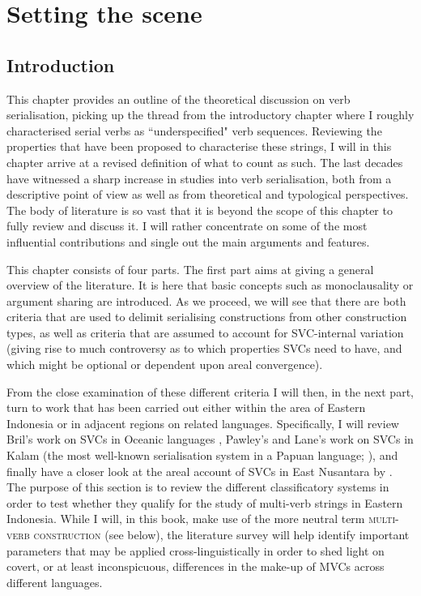 \chapter{Setting the scene}\label{ch:theory}
\section{Introduction}
This chapter provides an outline of the theoretical discussion on verb serialisation, picking up the thread from the introductory chapter where I roughly characterised serial verbs as ``underspecified" verb sequences. Reviewing the properties that have been proposed to characterise these strings, I will in this chapter arrive at a revised definition of what to count as such. The last decades have witnessed a sharp increase in studies into verb serialisation, both from a descriptive point of view as well as from theoretical and typological perspectives. The body of literature is so vast that it is beyond the scope of this chapter to fully review and discuss it. I will rather concentrate on some of the most influential contributions and single out the main arguments and features.

This chapter consists of four parts. The first part aims at giving a general overview of the literature. It is here that basic concepts such as monoclausality or argument sharing are introduced. As we proceed, we will see that there are both criteria that are used to delimit serialising constructions from other construction types, as well as criteria that are assumed to account for SVC-internal variation (giving rise to much controversy as to which properties SVCs need to have, and which might be optional or dependent upon areal convergence). 

From the close examination of these different criteria I will then, in the next part, turn to work that has been carried out either within the area of Eastern Indonesia or in adjacent regions on related languages. Specifically, I will review Bril's work on SVCs in Oceanic languages \citep{bril2004complex,bril2007nexus}, Pawley's and Lane's work on SVCs in Kalam (the most well-known serialisation system in a Papuan language; \citealt{Pawley1987, pawley2011event, lane2008kalam}), and finally have a closer look at the areal account of SVCs in East Nusantara by \citet{vanstaden2008serial}. The purpose of this section is to review the different classificatory systems in order to test whether they qualify for the study of multi-verb strings in Eastern Indonesia. While I will, in this book, make use of the more neutral term \textsc{multi-verb construction} (see  below), the literature survey will help identify important parameters that may be applied cross-linguistically in order to shed light on covert, or at least inconspicuous, differences in the make-up of MVCs across different languages.

